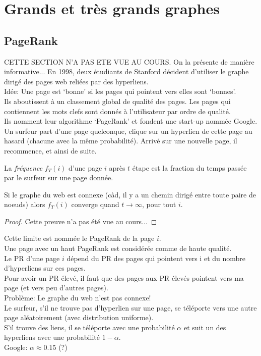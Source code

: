 \section{Grands et très grands graphes}
\subsection{PageRank}
CETTE SECTION N'A PAS ETE VUE AU COURS. On la présente de manière informative...
En 1998, deux étudiants de Stanford décident d'utiliser le graphe dirigé des pages web reliées par des hyperliens.\\
Idée: Une page est `bonne' si les pages qui pointent vers elles sont `bonnes'.\\
Ils aboutissent à un classement global de qualité des pages. Les pages qui contiennent les mots clefs sont donnés à l'utilisateur par ordre de qualité.\\
Ils nomment leur algorithme `PageRank' et fondent une start-up nommée Google. \\
Un surfeur part d'une page quelconque, clique sur un hyperlien de cette page au hasard (chacune avec la même probabilité). Arrivé sur une nouvelle page, il recommence, et ainsi de suite.\\
\begin{mydef}
  La \emph{fréquence} $f_T(i)$ d'une page $i$ après $t$ étape est la fraction du temps passée par le surfeur sur une page donnée.
\end{mydef}

\begin{mytheo}
  Si le graphe du web est connexe (càd, il y a un chemin dirigé entre toute paire de noeuds) alors $f_T(i)$ converge quand $t \to ∞$, pour tout $i$.
  \begin{proof}
     Cette preuve n'a pas été vue au cours...
  \end{proof}
\end{mytheo}

Cette limite est nommée le PageRank de la page $i$.\\
Une page avec un haut PageRank est considérée comme de haute qualité.\\
Le PR d'une page $i$ dépend du PR des pages qui pointent vers i et du nombre d'hyperliens sur ces pages.\\
Pour avoir un PR élevé, il faut que des pages aux PR élevés pointent vers ma page (et vers peu d'autres pages).\\
\newline
Problème: Le graphe du web n'est pas connexe!\\
Le surfeur, s'il ne trouve pas d'hyperlien sur une page, se téléporte vers une autre page aléatoirement (avec distribution uniforme).\\
S'il trouve des liens, il se téléporte avec une probabilité $\alpha$ et suit un des hyperliens avec une probabilité $1 − \alpha$.\\
Google: $\alpha ≈ 0.15$ (?)
